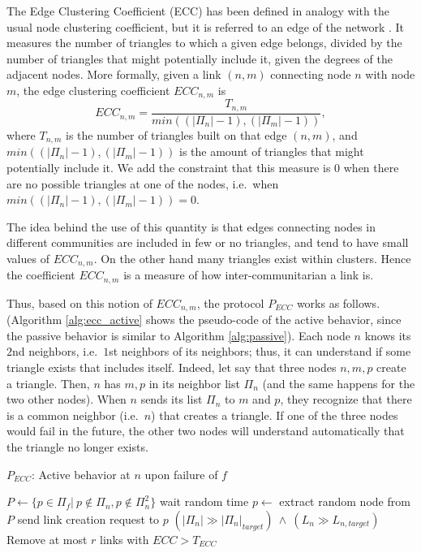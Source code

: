 \documentclass[10pt, conference, compsocconf]{IEEEtran}
\begin{document}
The Edge Clustering Coefficient (ECC) has been defined in analogy with the usual node clustering coefficient, but it is referred to an edge of the network \cite{radicchi2004}. It measures the number of triangles
to which a given edge belongs, divided by the number of triangles that might potentially include it, given the degrees of the adjacent nodes. More formally, given a link $(n, m)$ connecting node $n$ with node $m$, the edge clustering coefficient $ECC_{n,m}$ is
$$ECC_{n,m} = \frac{T_{n,m}}{min((|\Pi_n| - 1), (|\Pi_m| - 1))},$$
where $T_{n,m}$ is the number of triangles built on that edge $(n,m)$, and $min((|\Pi_n | -1), (|\Pi_m | -1))$ is the amount of triangles that might potentially include it. We add the constraint that this measure is $0$ when there are no possible triangles at one of the nodes, i.e.~when $min((|\Pi_n | - 1), (|\Pi_m | - 1))=0$.

The idea behind the use of this quantity is that edges connecting nodes in different communities are included in few or no triangles, and tend to have small values of $ECC_{n,m}$. On the other hand many triangles exist within clusters. Hence the coefficient $ECC_{n,m}$ is a measure of how inter-communitarian a link is.

Thus, based on this notion of $ECC_{n,m}$, the protocol $P_{ECC}$ works as follows. (Algorithm \ref{alg:ecc_active} shows the pseudo-code of the active behavior, since the passive behavior is similar to Algorithm \ref{alg:passive}).
Each node $n$ knows its $2$nd neighbors, i.e.~$1$st neighbors of its neighbors; thus, it can understand if some triangle exists that includes itself. 
Indeed, let say that three nodes $n, m, p$ create a triangle. Then, $n$ has $m,p$ in its neighbor list $\Pi_n$ (and the same happens for the two other nodes). When $n$ sends its list $\Pi_n$ to $m$ and $p$, they recognize that there is a common neighbor (i.e.~$n$) that creates a triangle.
If one of the three nodes would fail in the future, the other two nodes will understand automatically that the triangle no longer exists.

\begin{algorithm}[thbp]
\caption{$P_{ECC}$: Active behavior at $n$ upon failure of $f$}
\label{alg:ecc_active}
\begin{algorithmic}[1]
\State $P \gets \{ p \in \Pi_f | \ p \notin \Pi_n, p \notin \Pi^2_n \}$
\Statex
{}\label{code:ecc}
  \State wait random time 
  \State $p \gets$ extract random node from $P$ 
    \State send link creation request to $p$
 \EndWhile
\EndIf
\Statex 
\Require $(|\Pi_n| \gg |\Pi_n|_{target})\ \wedge \ (L_{n} \gg L_{n, target})$
\State Remove at most $r$ links with $ECC > T_{ECC}$
\end{algorithmic}
\end{algorithm}
\end{document}

